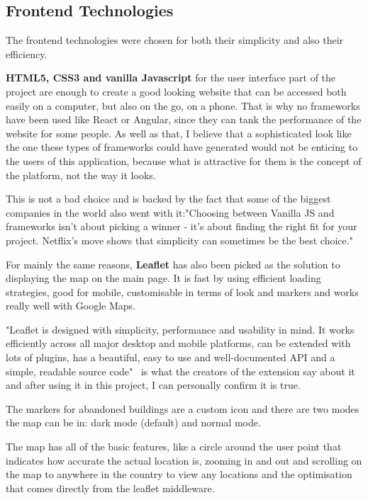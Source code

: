\documentclass[12pt,a4paper]{report}
\begin{document}
\subsection{Frontend Technologies}
The frontend technologies were chosen for both their simplicity and also their efficiency. 

\textbf{HTML5, CSS3 and vanilla Javascript} for the user interface part of the project are enough to create a good looking website that can be accessed both easily on a computer, but also on the go, on a phone. That is why no frameworks have been used like React or Angular, since they can tank the performance of the website for some people. As well as that, I believe that a sophisticated look like the one these types of frameworks could have generated would not be enticing to the users of this application, because what is attractive for them is the concept of the platform, not the way it looks.

This is not a bad choice and is backed by the fact that some of the biggest companies in the world also went with it:"Choosing between Vanilla JS and frameworks isn't about picking a winner - it's about finding the right fit for your project. Netflix's move shows that simplicity can sometimes be the best choice."~\cite{vanillaVsFrameworks}

For mainly the same reasons, \textbf{Leaflet} has also been picked as the solution to displaying the map on the main page. It is fast by using efficient loading strategies, good for mobile, customisable in terms of look and markers and works really well with Google Maps.

"Leaflet is designed with simplicity, performance and usability in mind. It works efficiently across all major desktop and mobile platforms, can be extended with lots of plugins, has a beautiful, easy to use and well-documented API and a simple, readable source code"~\cite{leafletJs} is what the creators of the extension say about it and after using it in this project, I can personally confirm it is true.

The markers for abandoned buildings are a custom icon and there are two modes the map can be in: dark mode (default) and normal mode.

The map has all of the basic features, like a circle around the user point that indicates how accurate the actual location is, zooming in and out and scrolling on the map to anywhere in the country to view any locations and the optimisation that comes directly from the leaflet middleware.
\end{document}
